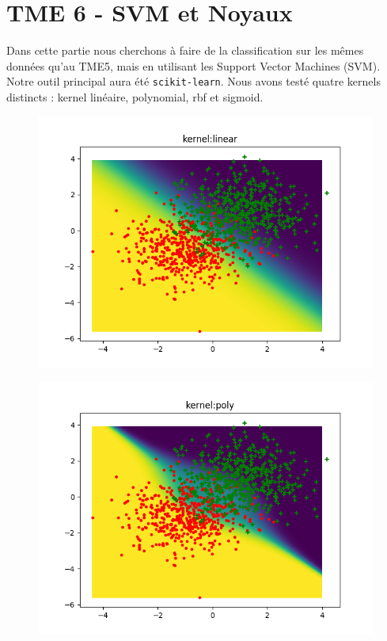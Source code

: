 \documentclass[a4paper]{article}
\begin{document}
\section*{TME 6 - SVM et Noyaux}

Dans cette partie nous cherchons à faire de la classification sur les mêmes données qu'au TME5, mais en utilisant les Support Vector Machines (SVM). Notre outil principal aura été \verb!scikit-learn!. Nous avons testé quatre kernels distincts : kernel linéaire, polynomial, rbf et sigmoid. 

\begin{figure}[ht!]
\begin{center}
\begin{minipage}{0.45\textwidth}
\includegraphics[scale=0.5]{linear.png}
\label{f1_logdist}
\end{minipage}\hfill
\begin{minipage}{0.45\textwidth}
\includegraphics[scale=0.5]{poly.png}
\label{f2_logdist}
\end{minipage}
\end{center}
\end{figure}
\end{document}
